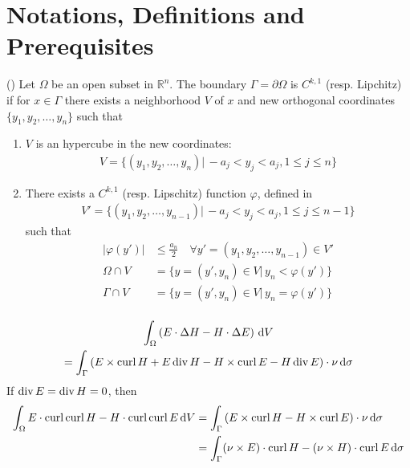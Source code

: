 \section{Notations, Definitions and Prerequisites} 

\begin{dfn}[Boundary] (\citet[p.~5]{grisvard})
  Let $\Omega$ be an open subset in $\mathbb{R}^n$. The boundary $\Gamma=\partial\Omega$ is $C^{k,1}$ (resp. Lipchitz) if for $x\in\Gamma$ there exists a neighborhood $V$ of $x$ and new orthogonal coordinates $\{y_1, y_2, \ldots, y_n\}$ such that 
  \begin{enumerate}
    \item $V$ is an hypercube in the new coordinates:
      \begin{align*}
        V = \{(y_1, y_2, \ldots,y_n)|\,-a_j<y_j<a_j, 1\leqslant j\leqslant n\}
      \end{align*}
    \item There exists a $C^{k, 1}$ (resp. Lipschitz) function $\varphi$, defined in
      \begin{align*}
        V' = \{(y_1, y_2, \ldots,y_{n-1})|\,-a_j<y_j<a_j, 1\leqslant j\leqslant n-1\}
      \end{align*}
      such that
      \begin{align*}
        |\varphi(y')| &\leqslant \frac{a_n}{2}\quad\forall y'=(y_1, y_2,\ldots, y_{n-1})\in V' \\
        \Omega\cap V &= \{y=(y', y_n)\in V|\,y_n<\varphi(y')\} \\
        \Gamma\cap V &= \{y=(y', y_n)\in V|\,y_n=\varphi(y')\} \\
      \end{align*}
  \end{enumerate}
\end{dfn}

\begin{prp}
  \begin{multline*}
    \int_{\Omega}\left(E\cdot\Delta H - H\cdot\Delta E\right)\,\text{d}V\\=\int_{\Gamma}\left(E\times\operatorname{curl} H + E\operatorname{div} H - H\times\operatorname{curl} E - H\operatorname{div} E\right)\cdot\nu\,\text{d}\sigma
  \end{multline*}
  If $\operatorname{div} E=\operatorname{div} H=0$, then
  \begin{equation}\label{eq:green}
  \begin{split}
    \int_{\Omega}E\cdot\operatorname{curl}\operatorname{curl} H - H\cdot\operatorname{curl}\operatorname{curl} E\,\text{d}V &=\int_{\Gamma}\left(E\times\operatorname{curl} H - H\times\operatorname{curl} E\right)\cdot\nu\,\text{d}\sigma\\
    &=\int_{\Gamma}(\nu\times E)\cdot\operatorname{curl} H - (\nu\times H)\cdot\operatorname{curl} E\,\text{d}\sigma
  \end{split}
\end{equation}
\end{prp}

